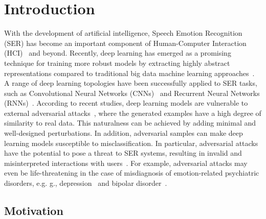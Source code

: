 \chapter{Introduction}
\label{chap:introduction}
\setcounter{page}{1}

With the development of artificial intelligence, Speech Emotion Recognition (SER) has become an important component of Human-Computer Interaction (HCI)~\cite{ZhangHJ14-3} and beyond. Recently, deep learning has emerged as a promising technique for training more robust models by extracting highly abstract representations compared to traditional big data machine learning approaches~\cite{triantafyllopoulos2019towards}. A range of deep learning topologies have been successfully applied to SER tasks, such as Convolutional Neural Networks (CNNs)~\cite{trigeorgis2016adieu} and Recurrent Neural Networks (RNNs)~\cite{zhao2019exploring}.
According to recent studies, deep learning models are vulnerable to external adversarial attacks~\cite{ren2020enhancing}, where the generated examples have a high degree of similarity to real data.
This naturalness can be achieved by adding minimal and well-designed perturbations. In addition, adversarial samples can make deep learning models susceptible to misclassification. In particular, adversarial attacks have the potential to pose a threat to SER systems, resulting in invalid and misinterpreted interactions with users~\cite{ren2020generating}. For example, adversarial attacks may even be life-threatening in the case of misdiagnosis of emotion-related psychiatric disorders, e.g. g., depression~\cite{ringeval2019avec} and bipolar disorder~\cite{ren2019multi}.

\section{Motivation}

